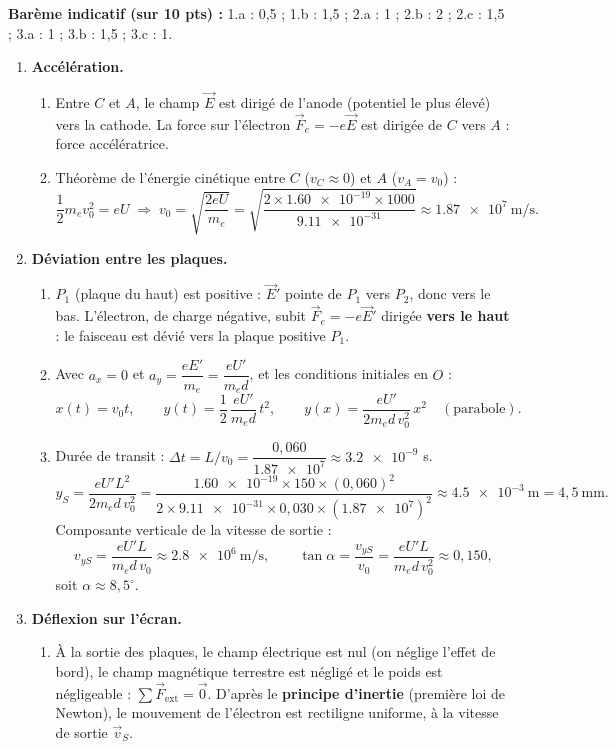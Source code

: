 \documentclass[11pt]{article}
\begin{document}
\begin{corrige}
\textbf{Barème indicatif (sur 10 pts) :} 1.a : 0,5 ; 1.b : 1,5 ; 2.a : 1 ; 2.b : 2 ; 2.c : 1,5 ; 3.a : 1 ; 3.b : 1,5 ; 3.c : 1.

\begin{enumerate}
\item \textbf{Accélération.}
\begin{enumerate}
\item Entre $C$ et $A$, le champ $\vec{E}$ est dirigé de l'anode (potentiel le plus élevé) vers la cathode. La force sur l'électron $\vec{F}_e = -e\vec{E}$ est dirigée de $C$ vers $A$ : force accélératrice.
\item Théorème de l'énergie cinétique entre $C$ ($v_C \approx 0$) et $A$ ($v_A = v_0$) :
\[
\frac{1}{2}m_e v_0^2 = eU \;\Longrightarrow\; v_0 = \sqrt{\frac{2eU}{m_e}} = \sqrt{\frac{2\times\num{1,60e-19}\times 1000}{\num{9,11e-31}}} \approx \num{1,87e7}~\mathrm{m/s}.
\]
\end{enumerate}
\item \textbf{Déviation entre les plaques.}
\begin{enumerate}
\item $P_1$ (plaque du haut) est positive : $\vec{E}'$ pointe de $P_1$ vers $P_2$, donc vers le bas. L'électron, de charge négative, subit $\vec{F}_e = -e\vec{E}'$ dirigée \textbf{vers le haut} : le faisceau est dévié vers la plaque positive $P_1$.
\item Avec $a_x = 0$ et $a_y = \dfrac{eE'}{m_e} = \dfrac{eU'}{m_e d}$, et les conditions initiales en $O$ :
\[
x(t) = v_0 t, \qquad y(t) = \frac{1}{2}\,\frac{eU'}{m_e d}\,t^2, \qquad y(x) = \frac{eU'}{2m_e d\, v_0^2}\,x^2 \quad (\text{parabole}).
\]
\item Durée de transit : $\Delta t = L/v_0 = \dfrac{0,060}{\num{1,87e7}} \approx \num{3,2e-9}$ s.
\[
y_S = \frac{eU'L^2}{2m_e d\, v_0^2} = \frac{\num{1,60e-19}\times 150\times(0,060)^2}{2\times\num{9,11e-31}\times 0,030\times(\num{1,87e7})^2} \approx \num{4,5e-3}~\mathrm{m} = 4,5~\mathrm{mm}.
\]
Composante verticale de la vitesse de sortie :
\[
v_{yS} = \frac{eU'L}{m_e d\, v_0} \approx \num{2,8e6}~\mathrm{m/s}, \qquad \tan\alpha = \frac{v_{yS}}{v_0} = \frac{eU'L}{m_e d\, v_0^2} \approx 0,150,
\]
soit $\alpha \approx 8,5^\circ$.
\end{enumerate}
\item \textbf{Déflexion sur l'écran.}
\begin{enumerate}
\item À la sortie des plaques, le champ électrique est nul (on néglige l'effet de bord), le champ magnétique terrestre est négligé et le poids est négligeable : $\sum\vec{F}_{\text{ext}} = \vec{0}$. D'après le \textbf{principe d'inertie} (première loi de Newton), le mouvement de l'électron est rectiligne uniforme, à la vitesse de sortie $\vec{v}_S$.

\end{enumerate}
\end{enumerate}
\end{corrige}
\end{document}
